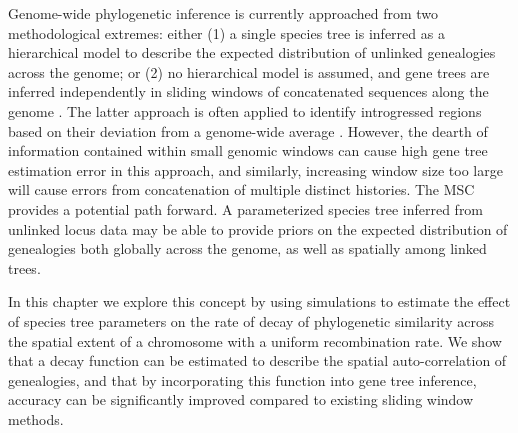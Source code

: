 \documentclass[11pt]{article}
\begin{document}
Genome-wide phylogenetic inference is currently approached from two methodological extremes: either (1) a single species tree is inferred as a hierarchical model to describe the expected distribution of unlinked genealogies across the genome; or (2) no hierarchical model is assumed, and gene trees are inferred independently in sliding windows of concatenated sequences along the genome \citep{martin_exploring_2017}. The latter approach is often applied to identify introgressed regions based on their deviation from a genome-wide average \citep{wang_evidence_2019}. However, the dearth of information contained within small genomic windows can cause high gene tree estimation error in this approach, and similarly, increasing window size too large will cause errors from concatenation of multiple distinct histories. The MSC provides a potential path forward. 
A parameterized species tree inferred from unlinked locus data may be able to provide priors on the expected distribution of genealogies both globally across the genome, as well as spatially among linked trees.

In this chapter we explore this concept by using simulations to estimate the effect of species tree parameters on the rate of decay of phylogenetic similarity across the spatial extent of a chromosome with a uniform recombination rate. We show that a decay function can be estimated to describe the spatial auto-correlation of genealogies, and that by incorporating this function into gene tree inference, accuracy can be significantly improved compared to existing sliding window methods. 



\end{document}

